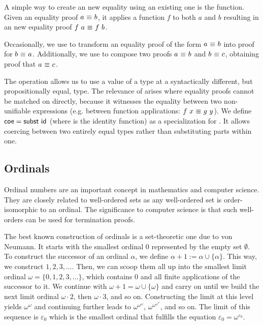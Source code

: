 \documentclass[manuscript,screen,review,anonymous]{acmart}
\begin{document}
A simple way to create an new equality using an existing one 
is the  function.
Given an equality proof  
$a ~\AgdaDatatype{$\equiv$}~ b$, it applies a function $f$ to both $a$ and $b$
resulting in an new equality proof $f~a ~\AgdaDatatype{$\equiv$}~ f~b$.

Occasionally, we use {} to transform 
an equality proof of the form $a ~\AgdaDatatype{$\equiv$}~ b$ into
proof for $b ~\AgdaDatatype{$\equiv$}~ a$. Additionally, we 
use {} to compose two proofs
$a ~\AgdaDatatype{$\equiv$}~ b$ and $b ~\AgdaDatatype{$\equiv$}~ c$,
obtaining proof that $a ~\AgdaDatatype{$\equiv$}~ c$.

The {} operation allows us to use a value of 
a type at a syntactically different, but propositionally equal, type.
The relevance of {} arises where equality proofs cannot be matched
on directly, because it witnesses the equality between two non-unifiable
expressions (e.g. between function applications: $f~x~\AgdaDatatype{$\equiv$}~g~y$).
We define $\AgdaFunction{coe}=\AgdaFunction{subst}~\AgdaFunction{id}$ 
(where  is the identity function) 
as a specialization for {}.
It allows coercing between two entirely equal types 
rather than substituting parts within one.


\subsection{Ordinals}
\label{sec:ordinals}

Ordinal numbers are an important concept in mathematics and computer
science. They are closely related to well-ordered sets as any
well-ordered set is order-isomorphic to an ordinal. The significance
to computer science is that such well-orders can be used for
termination proofs.

The best known construction of ordinals is a set-theoretic one due to
von Neumann. It starts with the smallest ordinal $0$ represented by
the empty set $\emptyset$. To construct the successor of an ordinal
$\alpha$, we define $\alpha+1  := \alpha \cup \{ \alpha \}$. This way,
we construct $1, 2, 3, \dots$. Then, we can scoop them all up into the
smallest limit ordinal $\omega = \{ 0, 1, 2, 3, \dots \}$, which
contains $0$ and all finite applications of the successor to it. We
continue with $\omega + 1 = \omega \cup \{ \omega \}$ and carry on
until we build the next limit ordinal $\omega \cdot 2$, then $\omega
\cdot 3$, and so on. Constructing the limit at this level yields
$\omega^\omega$ and continuing further leads to
$\omega^{\omega^\omega}$, $\omega^{\omega^{\omega^\omega}}$, and so
on. The limit of this sequence is $\varepsilon_0$ which is the
smallest ordinal that fulfills the equation
$\varepsilon_0 = \omega^{\varepsilon_0}$.
\end{document}
